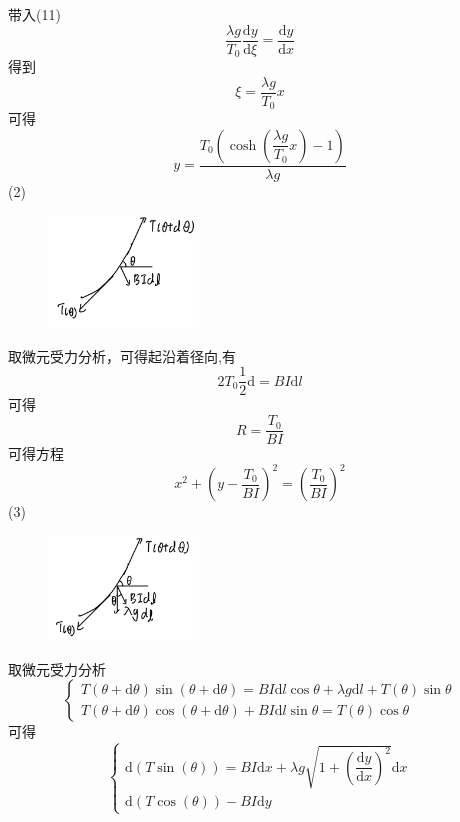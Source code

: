 \documentclass{article}
\begin{document}
带入(11)
\[
\dfrac{\lambda g}{T_{0}}\dfrac{\mathrm{d}y}{\mathrm{d}\xi}=\dfrac{\mathrm{d}y}{\mathrm{d}x}
\tag{13}
\]
得到
\[
\xi=\dfrac{\lambda g}{T_{0}} x
\tag{14}
\]
可得
\[
y=\dfrac{T_0\left(\cosh\left(\dfrac{\lambda g}{T_{0}} x\right)-1\right)}{\lambda g}
\tag{15}
\]
(2)
\par
\begin{figure}
	\vspace{-15pt}    %
	\includegraphics[width=4cm]{img/2.3.jpeg}\\
	\vspace{-15pt}    %
	\caption{}
	\vspace{-15pt}    %
\end{figure}
取微元受力分析，可得起沿着径向,有
\[
2T_0\frac{1}{2}\mathrm{d}=BI\mathrm{d}l
\tag{16}
\]
可得
\[
R=\dfrac{T_0}{BI}
\tag{17}
\]
可得方程
\[
x^2+\left(y-\dfrac{T_0}{BI}\right)^2=\left(\dfrac{T_0}{BI}\right)^2
\tag{18}
\]
(3)
\par
\begin{figure}
	\vspace{-15pt}    %
	\includegraphics[width=4cm]{img/2.4.jpeg}\\
	\vspace{-15pt}    %
	\caption{}
	\vspace{-15pt}    %
\end{figure}
取微元受力分析
\[
\begin{cases}
    T\left( \theta +\mathrm{d}\theta \right) \sin \left( \theta +\mathrm{d}\theta \right) =BI\mathrm{d}l\cos \theta +\lambda g\mathrm{d}l+T(\theta)\sin \theta \\
    T\left( \theta +\mathrm{d}\theta \right) \cos \left( \theta +\mathrm{d}\theta \right) +BI\mathrm{d}l\sin \theta =T(\theta)\cos \theta 
\end{cases}
\tag{19}
\]
可得
\[
\begin{cases}
\mathrm{d}(T\sin(\theta))=BI\mathrm{d}x+\lambda g \sqrt{1+\left(\dfrac{\mathrm{d}y}{\mathrm{d}x}\right)^2}\mathrm{d}x\\
\mathrm{d}(T\cos(\theta))-BI\mathrm{d}y
\end{cases}
\tag{20}
\]
\end{document}
